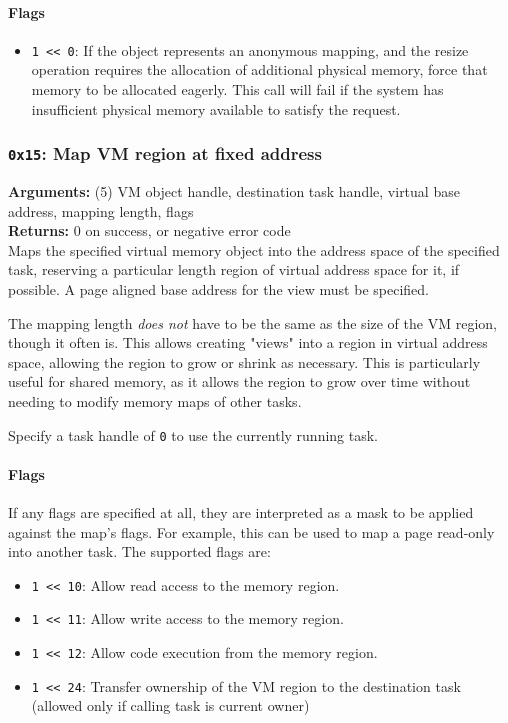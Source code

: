 \documentclass[11pt]{article}
\begin{document}
\paragraph{Flags}
\begin{itemize}
\item \texttt{1 << 0}: If the object represents an anonymous mapping, and the resize operation requires the allocation of additional physical memory, force that memory to be allocated eagerly. This call will fail if the system has insufficient physical memory available to satisfy the request.
\end{itemize}

\subsubsection{{\tt 0x15}: Map VM region at fixed address}
\textbf{Arguments:} (5) VM object handle, destination task handle, virtual base address, mapping length, flags \\
\textbf{Returns:} 0 on success, or negative error code \\

Maps the specified virtual memory object into the address space of the specified task, reserving a particular length region of virtual address space for it, if possible. A page aligned base address for the view must be specified.

The mapping length \textit{does not} have to be the same as the size of the VM region, though it often is. This allows creating "views" into a region in virtual address space, allowing the region to grow or shrink as necessary. This is particularly useful for shared memory, as it allows the region to grow over time without needing to modify memory maps of other tasks.

Specify a task handle of \texttt{0} to use the currently running task.

\paragraph{Flags}
If any flags are specified at all, they are interpreted as a mask to be applied against the map's flags. For example, this can be used to map a page read-only into another task. The supported flags are:

\begin{itemize}
\item \texttt{1 << 10}: Allow read access to the memory region.
\item \texttt{1 << 11}: Allow write access to the memory region.
\item \texttt{1 << 12}: Allow code execution from the memory region.
\item \texttt{1 << 24}: Transfer ownership of the VM region to the destination task (allowed only if calling task is current owner)
\end{itemize}
\end{document}
